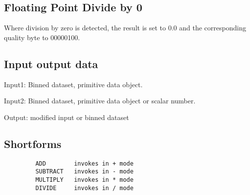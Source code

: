 \documentclass{book}
\renewcommand{\_}{{\tt\char'137}}     %
\begin{document}
\subsection{Floating Point Divide by 0}
Where division by zero is detected, the result is set to 0.0
and the corresponding quality byte to 00000100.

\subsection{Input output data}
Input1: Binned dataset, primitive data object.

Input2: Binned dataset, primitive data object
or scalar number.

Output: modified input or binned dataset

\subsection{Shortforms}
\begin{verbatim}
         ADD        invokes in + mode
         SUBTRACT   invokes in - mode
         MULTIPLY   invokes in * mode
         DIVIDE     invokes in / mode
\end{verbatim}
\end{document}

